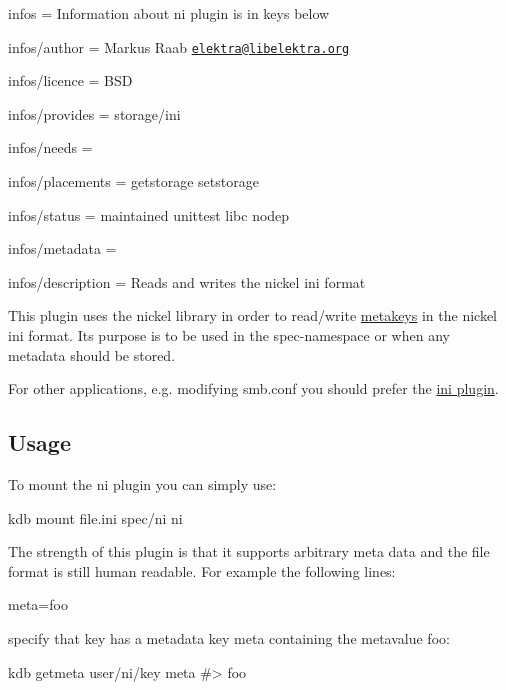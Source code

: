 
\begin{DoxyItemize}
\item infos = Information about ni plugin is in keys below
\item infos/author = Markus Raab \href{mailto:elektra@libelektra.org}{\tt elektra@libelektra.\+org}
\item infos/licence = B\+SD
\item infos/provides = storage/ini
\item infos/needs =
\item infos/placements = getstorage setstorage
\item infos/status = maintained unittest libc nodep
\item infos/metadata =
\item infos/description = Reads and writes the nickel ini format
\end{DoxyItemize}

This plugin uses the nickel library in order to read/write \hyperlink{md_doc_help_elektra-metadata_doc_help_elektra-metadata_md}{metakeys} in the nickel ini format. It\textquotesingle{}s purpose is to be used in the {\ttfamily spec}-\/namespace or when any metadata should be stored.

For other applications, e.\+g. modifying {\ttfamily smb.\+conf} you should prefer the \hyperlink{md_src_plugins_ini_README_src_plugins_ini_README_md}{ini plugin}.

\subsection*{Usage}

To mount the ni plugin you can simply use\+:


\begin{DoxyCode}
kdb mount file.ini spec/ni ni
\end{DoxyCode}


The strength of this plugin is that it supports arbitrary meta data and the file format is still human readable. For example the following lines\+:


\begin{DoxyCode}
[key]
meta=foo
\end{DoxyCode}


specify that {\ttfamily key} has a metadata key {\ttfamily meta} containing the metavalue {\ttfamily foo}\+:


\begin{DoxyCode}
kdb getmeta user/ni/key meta
#> foo
\end{DoxyCode}


